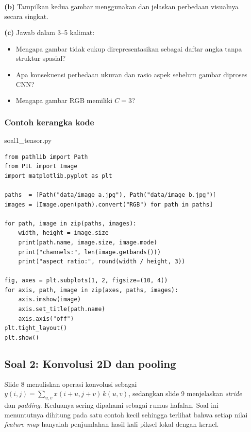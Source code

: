 \documentclass[12pt, a4paper]{article}
\begin{document}
\textbf{(b)} Tampilkan kedua gambar menggunakan  dan jelaskan perbedaan visualnya secara singkat.

\textbf{(c)} Jawab dalam 3--5 kalimat:
\begin{itemize}
  \item Mengapa gambar tidak cukup direpresentasikan sebagai daftar angka tanpa struktur spasial?
  \item Apa konsekuensi perbedaan ukuran dan rasio aspek sebelum gambar diproses CNN?
  \item Mengapa gambar RGB memiliki $C=3$?
\end{itemize}

\subsubsection{Contoh kerangka kode}
\label{sec:soal1-kode}

\begin{codewindow}{soal1\_tensor.py}
\begin{lstlisting}[style=pycode]
from pathlib import Path
from PIL import Image
import matplotlib.pyplot as plt

paths  = [Path("data/image_a.jpg"), Path("data/image_b.jpg")]
images = [Image.open(path).convert("RGB") for path in paths]

for path, image in zip(paths, images):
    width, height = image.size
    print(path.name, image.size, image.mode)
    print("channels:", len(image.getbands()))
    print("aspect ratio:", round(width / height, 3))

fig, axes = plt.subplots(1, 2, figsize=(10, 4))
for axis, path, image in zip(axes, paths, images):
    axis.imshow(image)
    axis.set_title(path.name)
    axis.axis("off")
plt.tight_layout()
plt.show()
\end{lstlisting}
\end{codewindow}


\clearpage
\subsection{Soal 2: Konvolusi 2D dan pooling}
\label{sec:soal2}

Slide 8 menuliskan operasi konvolusi sebagai $y(i,j) = \sum_{u,v} x(i+u, j+v)\, k(u,v)$, sedangkan slide 9 menjelaskan \emph{stride} dan \emph{padding}. Keduanya sering dipahami sebagai rumus hafalan. Soal ini menuntutnya dihitung pada satu contoh kecil sehingga terlihat bahwa setiap nilai \emph{feature map} hanyalah penjumlahan hasil kali piksel lokal dengan kernel.
\end{document}

